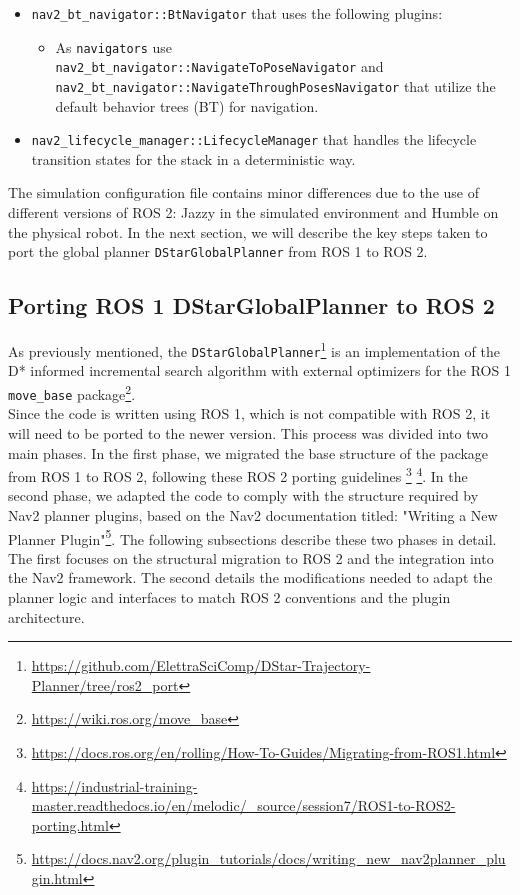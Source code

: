 \begin{itemize}
	\item \texttt{nav2\_bt\_navigator::BtNavigator} that uses the following plugins:
	\begin{itemize}
		\item As \texttt{navigators} use\\ \texttt{nav2\_bt\_navigator::NavigateToPoseNavigator} and\\ \texttt{nav2\_bt\_navigator::NavigateThroughPosesNavigator} that utilize the default behavior trees (BT) for navigation.
	\end{itemize}
	
	\item \texttt{nav2\_lifecycle\_manager::LifecycleManager} that handles the lifecycle transition states for the stack in a deterministic way.
\end{itemize}
The simulation configuration file contains minor differences due to the use of different versions of ROS 2: Jazzy in the simulated environment and Humble on the physical robot.
In the next section, we will describe the key steps taken to port the global planner \texttt{DStarGlobalPlanner} from ROS 1 to ROS 2.
\subsection{Porting ROS 1 DStarGlobalPlanner to ROS 2}
As previously mentioned, the \texttt{DStarGlobalPlanner}\footnote{\href{https://github.com/ElettraSciComp/DStar-Trajectory-Planner/tree/ros2_port}{https://github.com/ElettraSciComp/DStar-Trajectory-Planner/tree/ros2\_port}} is an implementation of the D* informed incremental search algorithm\cite{overview_Route_Planning_Algorithms} with external optimizers\cite{10.1007/978-3-031-67295-8_33} for the ROS 1 \texttt{move\_base} package\footnote{\href{https://wiki.ros.org/move_base}{https://wiki.ros.org/move\_base}}.\\
Since the code is written using ROS 1, which is not compatible with ROS 2, it will need to be ported to the newer version. This process was divided into two main phases. In the first phase, we migrated the base structure of the package from ROS 1 to ROS 2, following these ROS 2 porting guidelines \footnote{\href{https://docs.ros.org/en/rolling/How-To-Guides/Migrating-from-ROS1.html}{https://docs.ros.org/en/rolling/How-To-Guides/Migrating-from-ROS1.html}} \footnote{\href{https://industrial-training-master.readthedocs.io/en/melodic/\_source/session7/ROS1-to-ROS2-porting.html}{https://industrial-training-master.readthedocs.io/en/melodic/\_source/session7/ROS1-to-ROS2-porting.html}}. In the second phase, we adapted the code to comply with the structure required by Nav2 planner plugins, based on the Nav2 documentation titled: "Writing a New Planner Plugin"\footnote{\href{https://docs.nav2.org/plugin_tutorials/docs/writing_new_nav2planner_plugin.html}{https://docs.nav2.org/plugin\_tutorials/docs/writing\_new\_nav2planner\_plugin.html}}.
The following subsections describe these two phases in detail. The first focuses on the structural migration to ROS 2 and the integration into the Nav2 framework. The second details the modifications needed to adapt the planner logic and interfaces to match ROS 2 conventions and the plugin architecture.
